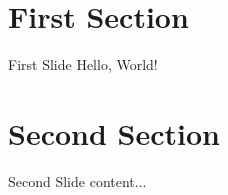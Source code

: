 
\section{First Section}

\begin{frame}[c]{First Slide}
    \centering
    Hello, World! 
\end{frame}


\section{Second Section}

\begin{frame}[c]{Second Slide}
    content...
\end{frame}
